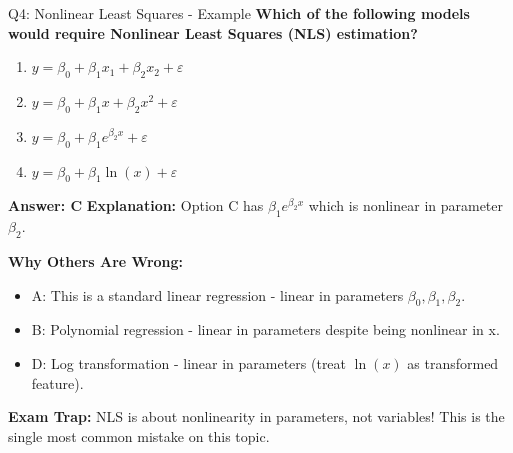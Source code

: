 \documentclass[8pt]{beamer}
\begin{document}
	\begin{frame}{Q4: Nonlinear Least Squares - Example}
		\fontsize{6.5}{7.5}\selectfont
		\textbf{Which of the following models would require Nonlinear Least Squares (NLS) estimation?}
		
		\begin{enumerate}
			\item $y = \beta_0 + \beta_1 x_1 + \beta_2 x_2 + \varepsilon$
			\item $y = \beta_0 + \beta_1 x + \beta_2 x^2 + \varepsilon$
			\item $y = \beta_0 + \beta_1 e^{\beta_2 x} + \varepsilon$
			\item $y = \beta_0 + \beta_1 \ln(x) + \varepsilon$
		\end{enumerate}
		
		\vspace{0.05cm}
		\textcolor{myblue}{\textbf{Answer: C}}
		\vspace{0.05cm}
		\textcolor{myblue}{\textbf{Explanation:}} Option C has $\beta_1 e^{\beta_2 x}$ which is nonlinear in parameter $\beta_2$.
		
		\vspace{0.05cm}
		\textcolor{myred}{\textbf{Why Others Are Wrong:}}
		\begin{itemize}
			\item \textcolor{myred}{A:} This is a standard linear regression - linear in parameters $\beta_0, \beta_1, \beta_2$.
			\item \textcolor{myred}{B:} Polynomial regression - linear in parameters despite being nonlinear in x.
			\item \textcolor{myred}{D:} Log transformation - linear in parameters (treat $\ln(x)$ as transformed feature).
		\end{itemize}
		
		\textcolor{myred}{\textbf{Exam Trap:}} NLS is about \textcolor{myblue}{nonlinearity in parameters}, not variables! This is the single most common mistake on this topic.
	\end{frame}
	
\end{document}
